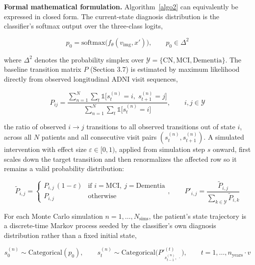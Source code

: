 \documentclass[pdflatex,sn-mathphys-num]{sn-jnl}%
\theoremstyle{thmstyleone}%
\theoremstyle{thmstyletwo}%
\theoremstyle{thmstylethree}%
\begin{document}
\textbf{Formal mathematical formulation.} Algorithm~\ref{algo2} can equivalently be expressed in closed form. The current-state diagnosis distribution is the classifier's softmax output over the three-class logits,

\begin{equation}
p_0 = \mathrm{softmax}\big(f_\theta(v_{\mathrm{img}}, x')\big), \qquad p_0 \in \Delta^2
\label{eq5}
\end{equation}

where $\Delta^2$ denotes the probability simplex over $\mathcal{Y} = \{\mathrm{CN}, \mathrm{MCI}, \mathrm{Dementia}\}$. The baseline transition matrix $P$ (Section 3.7) is estimated by maximum likelihood directly from observed longitudinal ADNI visit sequences,

\begin{equation}
P_{ij} = \frac{\displaystyle\sum_{n=1}^{N}\sum_{t} \mathbb{1}\big[s_t^{(n)} = i,\; s_{t+1}^{(n)} = j\big]}{\displaystyle\sum_{n=1}^{N}\sum_{t} \mathbb{1}\big[s_t^{(n)} = i\big]}, \qquad i, j \in \mathcal{Y}
\label{eq6}
\end{equation}

the ratio of observed $i \to j$ transitions to all observed transitions out of state $i$, across all $N$ patients and all consecutive visit pairs $(s_t^{(n)}, s_{t+1}^{(n)})$. A simulated intervention with effect size $\varepsilon \in [0,1)$, applied from simulation step $s$ onward, first scales down the target transition and then renormalizes the affected row so it remains a valid probability distribution:

\begin{equation}
\tilde{P}_{i,j} = \begin{cases} P_{i,j}\,(1-\varepsilon) & \text{if } i = \mathrm{MCI},\ j = \mathrm{Dementia} \\[2pt] P_{i,j} & \text{otherwise} \end{cases}, \qquad P'_{i,j} = \frac{\tilde{P}_{i,j}}{\sum_{k \in \mathcal{Y}} \tilde{P}_{i,k}}
\label{eq7}
\end{equation}

For each Monte Carlo simulation $n = 1, \ldots, N_{\mathrm{sims}}$, the patient's state trajectory is a discrete-time Markov process seeded by the classifier's own diagnosis distribution rather than a fixed initial state,

\begin{equation}
s_0^{(n)} \sim \mathrm{Categorical}(p_0), \qquad s_t^{(n)} \sim \mathrm{Categorical}\big(P'^{(t)}_{s_{t-1}^{(n)},\,\cdot}\big), \qquad t = 1, \ldots, n_{\mathrm{years}} \cdot v
\label{eq8}
\end{equation}
\end{document}
